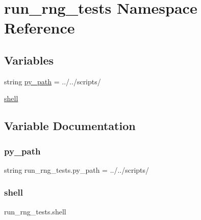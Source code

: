 \hypertarget{namespacerun__rng__tests}{}\section{run\+\_\+rng\+\_\+tests Namespace Reference}
\label{namespacerun__rng__tests}
\subsection*{Variables}
\begin{DoxyCompactItemize}
\item 
string \hyperlink{namespacerun__rng__tests_a01d90c1f10e8ba609cdd616ce9197dc7}{py\+\_\+path} = \textquotesingle{}../../scripts/\textquotesingle{}
\item 
\hyperlink{namespacerun__rng__tests_aefc143aeb80702f0c696f3c02198ccdb}{shell}
\end{DoxyCompactItemize}


\subsection{Variable Documentation}
\mbox{\label{namespacerun__rng__tests_a01d90c1f10e8ba609cdd616ce9197dc7}} 
\subsubsection{\texorpdfstring{py\+\_\+path}{py\_path}}
{\footnotesize\ttfamily string run\+\_\+rng\+\_\+tests.\+py\+\_\+path = \textquotesingle{}../../scripts/\textquotesingle{}}

\mbox{\label{namespacerun__rng__tests_aefc143aeb80702f0c696f3c02198ccdb}} 
\subsubsection{\texorpdfstring{shell}{shell}}
{\footnotesize\ttfamily run\+\_\+rng\+\_\+tests.\+shell}

